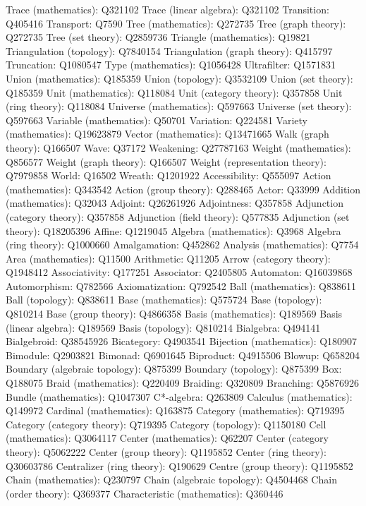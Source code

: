 Trace (mathematics): Q321102
Trace (linear algebra): Q321102
Transition: Q405416
Transport: Q7590
Tree (mathematics): Q272735
Tree (graph theory): Q272735
Tree (set theory): Q2859736
Triangle (mathematics): Q19821
Triangulation (topology): Q7840154
Triangulation (graph theory): Q415797
Truncation: Q1080547
Type (mathematics): Q1056428
Ultrafilter: Q1571831
Union (mathematics): Q185359
Union (topology): Q3532109
Union (set theory): Q185359
Unit (mathematics): Q118084
Unit (category theory): Q357858
Unit (ring theory): Q118084
Universe (mathematics): Q597663
Universe (set theory): Q597663
Variable (mathematics): Q50701
Variation: Q224581
Variety (mathematics): Q19623879
Vector (mathematics): Q13471665
Walk (graph theory): Q166507
Wave: Q37172
Weakening: Q27787163
Weight (mathematics): Q856577
Weight (graph theory): Q166507
Weight (representation theory): Q7979858
World: Q16502
Wreath: Q1201922
Accessibility: Q555097
Action (mathematics): Q343542
Action (group theory): Q288465
Actor: Q33999
Addition (mathematics): Q32043
Adjoint: Q26261926
Adjointness: Q357858
Adjunction (category theory): Q357858
Adjunction (field theory): Q577835
Adjunction (set theory): Q18205396
Affine: Q1219045
Algebra (mathematics): Q3968
Algebra (ring theory): Q1000660
Amalgamation: Q452862
Analysis (mathematics): Q7754
Area (mathematics): Q11500
Arithmetic: Q11205
Arrow (category theory): Q1948412
Associativity: Q177251
Associator: Q2405805
Automaton: Q16039868
Automorphism: Q782566
Axiomatization: Q792542
Ball (mathematics): Q838611
Ball (topology): Q838611
Base (mathematics): Q575724
Base (topology): Q810214
Base (group theory): Q4866358
Basis (mathematics): Q189569
Basis (linear algebra): Q189569
Basis (topology): Q810214
Bialgebra: Q494141
Bialgebroid: Q38545926
Bicategory: Q4903541
Bijection (mathematics): Q180907
Bimodule: Q2903821
Bimonad: Q6901645
Biproduct: Q4915506
Blowup: Q658204
Boundary (algebraic topology): Q875399
Boundary (topology): Q875399
Box: Q188075
Braid (mathematics): Q220409
Braiding: Q320809
Branching: Q5876926
Bundle (mathematics): Q1047307
C*-algebra: Q263809
Calculus (mathematics): Q149972
Cardinal (mathematics): Q163875
Category (mathematics): Q719395
Category (category theory): Q719395
Category (topology): Q1150180
Cell (mathematics): Q3064117
Center (mathematics): Q62207
Center (category theory): Q5062222
Center (group theory): Q1195852
Center (ring theory): Q30603786
Centralizer (ring theory): Q190629
Centre (group theory): Q1195852
Chain (mathematics): Q230797
Chain (algebraic topology): Q4504468
Chain (order theory): Q369377
Characteristic (mathematics): Q360446
